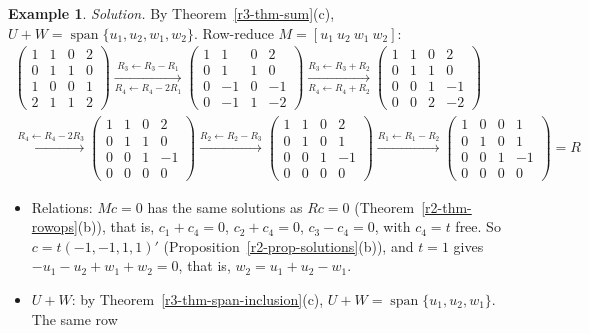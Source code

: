 \documentclass[12pt]{article}
\DeclareMathOperator{\Span}{span}
\theoremstyle{definition}
\newtheorem{example}[theorem]{Example}
\begin{document}
\begin{example}
\textit{Solution.} By Theorem~\ref{r3-thm-sum}(c), \(U+W=\Span\{u_1,u_2,w_1,w_2\}\). Row-reduce
\(M=[u_1\ u_2\ w_1\ w_2]\):
\[
\begin{gathered}
\begin{pmatrix}1&1&0&2\\0&1&1&0\\1&0&0&1\\2&1&1&2\end{pmatrix}
\xrightarrow[R_4\leftarrow R_4-2R_1]{R_3\leftarrow R_3-R_1}
\begin{pmatrix}1&1&0&2\\0&1&1&0\\0&-1&0&-1\\0&-1&1&-2\end{pmatrix}
\xrightarrow[R_4\leftarrow R_4+R_2]{R_3\leftarrow R_3+R_2}
\begin{pmatrix}1&1&0&2\\0&1&1&0\\0&0&1&-1\\0&0&2&-2\end{pmatrix}
\\
\xrightarrow{R_4\leftarrow R_4-2R_3}
\begin{pmatrix}1&1&0&2\\0&1&1&0\\0&0&1&-1\\0&0&0&0\end{pmatrix}
\xrightarrow{R_2\leftarrow R_2-R_3}
\begin{pmatrix}1&1&0&2\\0&1&0&1\\0&0&1&-1\\0&0&0&0\end{pmatrix}
\xrightarrow{R_1\leftarrow R_1-R_2}
\begin{pmatrix}1&0&0&1\\0&1&0&1\\0&0&1&-1\\0&0&0&0\end{pmatrix}=R
\end{gathered}
\]
\begin{itemize}
\item Relations: \(Mc=0\) has the same solutions as \(Rc=0\) (Theorem~\ref{r2-thm-rowops}(b)), that is,
\(c_1+c_4=0\), \(c_2+c_4=0\), \(c_3-c_4=0\), with \(c_4=t\) free. So \(c=t(-1,-1,1,1)'\)
(Proposition~\ref{r2-prop-solutions}(b)), and \(t=1\) gives \(-u_1-u_2+w_1+w_2=0\), that is,
\(w_2=u_1+u_2-w_1\).
\item \(U+W\): by Theorem~\ref{r3-thm-span-inclusion}(c), \(U+W=\Span\{u_1,u_2,w_1\}\). The same row

\end{itemize}
\end{example}
\end{document}
